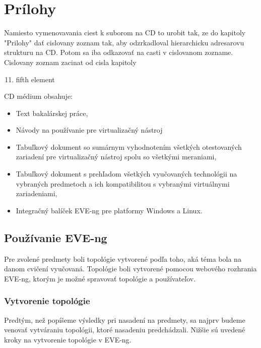 \chapter{Prílohy}
\label{chap:prilohy}

{\huge Namiesto vymenovavania ciest k suborom na CD to urobit tak, ze do kapitoly "Prilohy" dať cislovany zoznam tak, aby odzrkadloval hierarchicku adresarovu strukturu na CD. Potom sa iba odkazovať na casti v cislovanom zozname. Cislovany zoznam zacinat od cisla kapitoly}



\begin{enumerate}
  \setcounter{enumi}{10}
  \item fifth element
\end{enumerate}




CD médium obsahuje:

\begin{itemize}[noitemsep]
    \item Text bakalárskej práce,
    \item Návody na používanie pre virtualizačný nástroj
    \item Tabuľkový dokument so sumárnym vyhodnotením všetkých otestovaných zariadení pre virtualizačný nástroj spolu so všetkými meraniami,
    \item Tabuľkový dokument s prehľadom všetkých vyučovaných technológii na vybraných predmetoch a ich kompatibilitou s vybranými virtuálnymi zariadeniami,
    \item Integračný balíček EVE-ng pre platformy Windows a Linux.
\end{itemize}




\section{Používanie EVE-ng}

Pre zvolené predmety boli topológie vytvorené podľa toho, aká téma bola na danom cvičení vyučovaná. Topológie boli vytvorené pomocou webového rozhrania EVE-ng, ktorým je možné spravovať topológie a používateľov.




\subsection{Vytvorenie topológie}
\label{chap:vytvorenie_topo_eve-ng}
Predtým, než popíšeme výsledky pri nasadení na predmety, sa najprv budeme venovať vytváraniu topológii, ktoré nasadeniu predchádzali. Nižšie sú uvedené kroky na vytvorenie topológie v EVE-ng.

